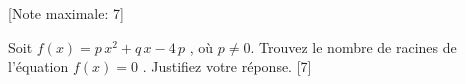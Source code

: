 \begin{question}
  \hspace*{\fill} [Note maximale: 7]\par
  \medskip
  \noindent Soit $f(x) = p\,x^2 + q\,x - 4\,p$ , où $p \ne 0$. Trouvez le nombre de racines de l'équation $f(x) = 0$ . Justifiez votre réponse.\hspace*{\fill} [7]\par
  
\end{question}
